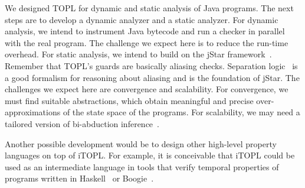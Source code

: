 \documentclass[preprint]{sigplanconf} %
\theoremstyle{definition}
\theoremstyle{remark}
\begin{document}
We designed TOPL for dynamic and static analysis of Java programs.
The next steps are to develop a dynamic analyzer and a static analyzer.
For dynamic analysis, we intend to instrument Java bytecode and run a checker in parallel with the real program.
The challenge we expect here is to reduce the run-time overhead.
For static analysis, we intend to build on the jStar framework~\cite{DBLP:conf/oopsla/DistefanoP08}.
Remember that TOPL's guards are basically aliasing checks.
Separation logic~\cite{reynolds2002} is a good formalism for reasoning about aliasing and is the foundation of jStar.
The challenges we expect here are convergence and scalability.
For convergence, we must find suitable abstractions, which obtain meaningful and precise over-approximations of the state space of the programs.
For scalability, we may need a tailored version of bi-abduction inference~\cite{dblp:conf/popl/CalcagnoDOY09}.

Another possible development would be to design other high-level property languages on top of iTOPL\null.
For example, it is conceivable that iTOPL could be used as an intermediate language in tools that verify temporal properties of programs written in Haskell~\cite{haskell} or Boogie~\cite{leino2008boogie}.


\softraggedright


\end{document}

